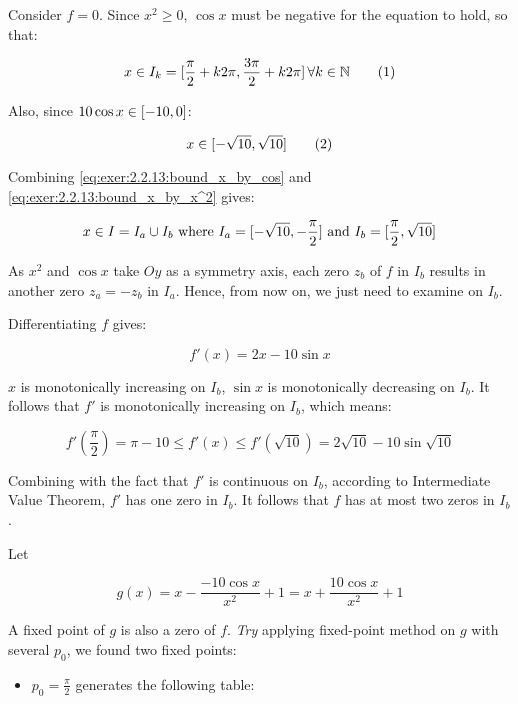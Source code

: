 \documentclass[../../../../Assignments]{subfiles}
\begin{document}
\begin{solution}
    Consider \(f = 0\). Since \(x^2 \geq 0\), \(\cos{x}\) must be negative for
    the equation to hold, so that:

    \begin{equation*}\label{eq:exer:2.2.13:bound_x_by_cos}
        x \in I_k = \interval{\frac{\pi}{2} + k 2 \pi}{\frac{3 \pi}{2} + k 2 \pi} \, \forall k \in \mathbb{N} \tag{1}
    \end{equation*}

    Also, since \(10 \cos{x} \in \interval{-10}{0}\):

    \begin{equation*}\label{eq:exer:2.2.13:bound_x_by_x^2}
        x \in \interval{- \sqrt{10}}{\sqrt{10}} \tag{2}
    \end{equation*}

    Combining \eqref{eq:exer:2.2.13:bound_x_by_cos} and
    \eqref{eq:exer:2.2.13:bound_x_by_x^2} gives:

    \[x \in I = I_a \cup I_b \text{ where } I_a = \interval{- \sqrt{10}}{- \frac{\pi}{2}} \text{ and } I_b = \interval{\frac{\pi}{2}}{\sqrt{10}}\]

    As \(x^2\) and \(\cos{x}\) take \(Oy\) as a symmetry axis, each zero \(z_b\)
    of \(f\) in \(I_b\) results in another zero \(z_a = - z_b\) in \(I_a\).
    Hence, from now on, we just need to examine on \(I_b\).

    Differentiating \(f\) gives:

    \[f'(x) = 2x - 10 \sin{x}\]

    \(x\) is monotonically increasing on \(I_b\), \(\sin{x}\) is monotonically
    decreasing on \(I_b\). It follows that \(f'\) is monotonically increasing on
    \(I_b\), which means:

    \[f'(\frac{\pi}{2}) = \pi - 10 \leq f'(x) \leq f'(\sqrt{10}) = 2 \sqrt{10} - 10 \sin{\sqrt{10}}\]

    Combining with the fact that \(f'\) is continuous on \(I_b\), according to
    Intermediate Value Theorem, \(f'\) has one zero in \(I_b\). It follows that
    \(f\) has at most two zeros in \(I_b\).

    Let

    \[g(x) = x - \frac{-10 \cos{x}}{x^2} + 1 = x + \frac{10 \cos{x}}{x^2} + 1\]

    A fixed point of \(g\) is also a zero of \(f\). \emph{Try} applying
    fixed-point method on \(g\) with several \(p_0\), we found two fixed points:

    \begin{itemize}
        \item \(p_0 = \frac{\pi}{2}\) generates the following table:


\end{itemize}
\end{solution}
\end{document}
